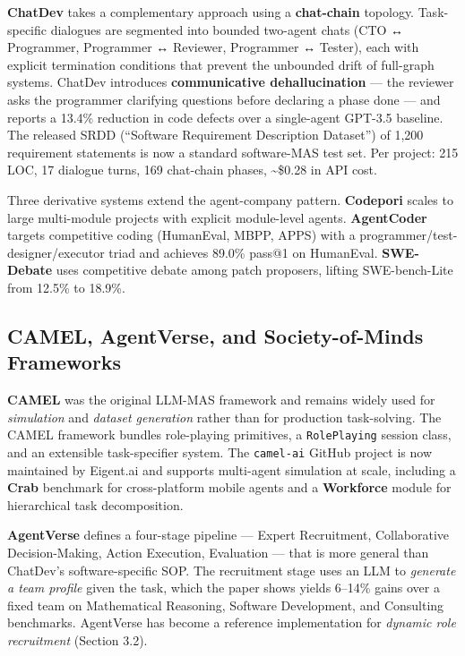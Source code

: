 \documentclass{article}
\begin{document}
\textbf{ChatDev} \citep{qian20242023} takes a complementary approach using a \textbf{chat-chain} topology. Task-specific dialogues are segmented into bounded two-agent chats (CTO ↔ Programmer, Programmer ↔ Reviewer, Programmer ↔ Tester), each with explicit termination conditions that prevent the unbounded drift of full-graph systems. ChatDev introduces \textbf{communicative dehallucination} --- the reviewer asks the programmer clarifying questions before declaring a phase done --- and reports a 13.4\% reduction in code defects over a single-agent GPT-3.5 baseline. The released SRDD (``Software Requirement Description Dataset'') of 1,200 requirement statements is now a standard software-MAS test set. Per project: 215 LOC, 17 dialogue turns, 169 chat-chain phases, \textasciitilde\$0.28 in API cost.

Three derivative systems extend the agent-company pattern. \textbf{Codepori} \citep{rasheed20242024} scales to large multi-module projects with explicit module-level agents. \textbf{AgentCoder} \citep{huang2023agentcodermultiage} targets competitive coding (HumanEval, MBPP, APPS) with a programmer/test-designer/executor triad and achieves 89.0\% pass@1 on HumanEval. \textbf{SWE-Debate} \citep{li20252025} uses competitive debate among patch proposers, lifting SWE-bench-Lite from 12.5\% to 18.9\%.

\subsection{CAMEL, AgentVerse, and Society-of-Minds Frameworks}\label{camel-agentverse-and-society-of-minds-frameworks}

\textbf{CAMEL} \citep{li2023camelcommunicative} was the original LLM-MAS framework and remains widely used for \emph{simulation} and \emph{dataset generation} rather than for production task-solving. The CAMEL framework bundles role-playing primitives, a \texttt{RolePlaying} session class, and an extensible task-specifier system. The \texttt{camel-ai} GitHub project is now maintained by Eigent.ai and supports multi-agent simulation at scale, including a \textbf{Crab} benchmark for cross-platform mobile agents and a \textbf{Workforce} module for hierarchical task decomposition.

\textbf{AgentVerse} \citep{chen2024asurveyonllmbasedm} defines a four-stage pipeline --- Expert Recruitment, Collaborative Decision-Making, Action Execution, Evaluation --- that is more general than ChatDev's software-specific SOP. The recruitment stage uses an LLM to \emph{generate a team profile} given the task, which the paper shows yields 6--14\% gains over a fixed team on Mathematical Reasoning, Software Development, and Consulting benchmarks. AgentVerse has become a reference implementation for \emph{dynamic role recruitment} (Section 3.2).
\end{document}

